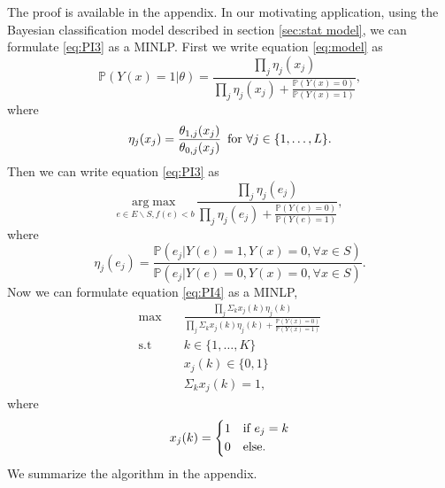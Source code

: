 \documentclass[12pt]{article}
\newcommand{\Prob}{\mathbb{P}}
\begin{document}
The proof is available in the appendix. In our motivating application, using the Bayesian classification model described in section \ref{sec:stat model}, we can formulate \eqref{eq:PI3} as a MINLP. First we write equation \eqref{eq:model} as
\begin{equation} \label{model1}
\Prob\left(Y(x) = 1 | \theta\right) =
\frac{\prod_j \eta_j(x_j)}{\prod_j \eta_j(x_j) + \frac{\Prob(Y(x)=0)}{\Prob(Y(x)=1)}},
\end{equation}
where
\begin{equation*}
\eta_j(x_j) = \frac{\theta_{1,j}(x_j)}{\theta_{0,j}(x_j)} \text{\,\,\,for $\forall j \in \{1,\ldots,L\}$}. 
\end{equation*}
Then we can write equation \eqref{eq:PI3} as
\begin{equation} \label{eq:PI4}
\underset{e \in E \backslash S, f(e)<b}{\mathrm{arg}\max} \, \frac{\prod_j \eta_j(e_j)}{\prod_j \eta_j(e_j) + \frac{\Prob(Y(e)=0)}{\Prob(Y(e)=1)}},
\end{equation}
where 
\begin{equation*}
\eta_j(e_j)=\frac{\Prob(e_j|Y(e)=1,Y(x)=0, \forall x \in S)}{\Prob(e_j|Y(e)=0,Y(x)=0, \forall x \in S)}.
\end{equation*}
Now we can formulate equation \eqref{eq:PI4} as a MINLP,
\begin{equation} \label{eq:PI5}
\begin{split}
\max \quad &\frac{\prod_j \Sigma_k x_j(k) \eta_j(k)}{\prod_j \Sigma_k x_j(k) \eta_j(k) + \frac{\Prob(Y(x)=0)}{\Prob(Y(x)=1)}} \\
\text{s.t} \quad &k \in \{1,\ldots,K\} \\
&x_j(k) \in \{0,1\}\\
&\Sigma_k x_j(k)=1,
\end{split}
\end{equation}
where
\begin{equation*}
x_j(k)=\begin{dcases}
        1 & \text{if $e_j=k$}\\
        0 & \text{else}.
\end{dcases}
\end{equation*}
We summarize the algorithm in the appendix.
\end{document}
